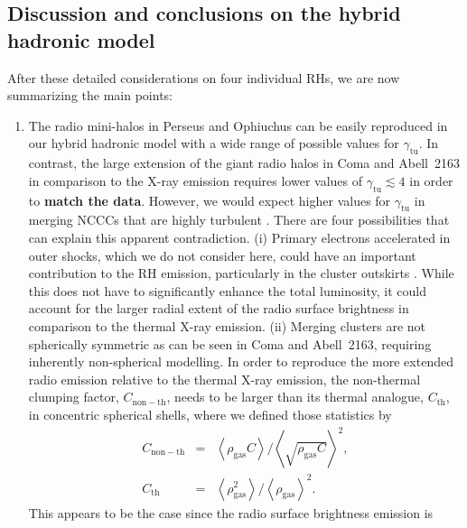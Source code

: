 \documentclass[traditabstract]{aa}
\def\C#1{{\bf #1}}
\newcommand{\rmn}{\mathrm}
\newcommand{\expval}[1]{\left\langle #1 \right\rangle}
\begin{document}

\subsection{Discussion and conclusions on the hybrid hadronic model}
\label{sec:discussion_hadronic}

After these detailed considerations on four individual RHs, we
are now summarizing the main points:
\begin{enumerate} 
\item The radio mini-halos in Perseus and Ophiuchus can be easily reproduced in
  our hybrid hadronic model with a wide range of possible values for
  $\gamma_{\rmn{tu}}$. In contrast, the large extension of the giant radio halos
  in Coma and Abell~2163 in comparison to the X-ray emission requires lower
  values of $\gamma_{\rmn{tu}}\lesssim4$ in order to \C{match the data}.
  However, we would expect higher values for $\gamma_{\rmn{tu}}$ in
  merging NCCCs that are highly turbulent \citep{2011A&A...527A..99E}.  There
  are four possibilities that can explain this apparent contradiction.  (i)
  Primary electrons accelerated in outer shocks, which we do not consider here,
  could have an important contribution to the RH emission, particularly in the
  cluster outskirts \citep{2008MNRAS.385.1211P}. While this does not have to
  significantly enhance the total luminosity, it could account for the larger
  radial extent of the radio surface brightness in comparison to the thermal
  X-ray emission. (ii) Merging clusters are not spherically symmetric as can be
  seen in Coma and Abell~2163, requiring inherently non-spherical modelling. In
  order to reproduce the more extended radio emission relative to the thermal
  X-ray emission, the non-thermal clumping factor, $C_{\rmn{non-th}}$, needs to
  be larger than its thermal analogue, $C_{\rmn{th}}$, in concentric spherical
  shells, where we defined those statistics by
  \begin{eqnarray}
    \label{eq:clumping}
    C_{\rmn{non-th}} &=&
    \expval{\rho_\rmn{gas} C}/\expval{\sqrt{\rho_\rmn{gas} C}}^2,\\
    C_{\rmn{th}} &=& 
    \expval{\rho_\rmn{gas}^2}/\expval{\rho_\rmn{gas}}^2.
  \end{eqnarray}
  This appears to be the case since the radio surface brightness emission is

\end{enumerate}
\end{document}
